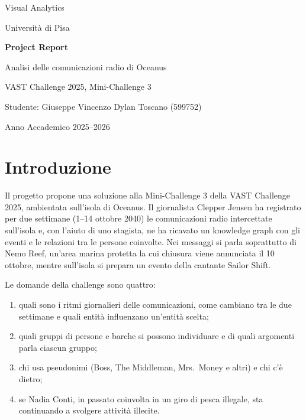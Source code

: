 \documentclass[11pt,a4paper]{article}
\begin{document}
\begin{titlepage}
\centering
\vspace*{3cm}
{\large Visual Analytics\par}
\vspace{0.4cm}
{\normalsize Università di Pisa\par}
\vspace{2.5cm}
{\huge\bfseries Project Report\par}
\vspace{0.8cm}
{\large Analisi delle comunicazioni radio di Oceanus\par}
\vspace{0.2cm}
{\large VAST Challenge 2025, Mini-Challenge 3\par}
\vfill
{\normalsize Studente: Giuseppe Vincenzo Dylan Toscano (599752)\par}
\vspace{0.4cm}
{\normalsize Anno Accademico 2025--2026\par}
\vspace*{2.5cm}
\end{titlepage}

\tableofcontents
\newpage

\section{Introduzione}
Il progetto propone una soluzione alla Mini-Challenge 3 della VAST Challenge 2025, ambientata sull'isola di
Oceanus. Il giornalista Clepper Jensen ha registrato per due settimane (1--14 ottobre 2040) le comunicazioni radio
intercettate sull'isola e, con l'aiuto di uno stagista, ne ha ricavato un knowledge graph con gli eventi e le
relazioni tra le persone coinvolte. Nei messaggi si parla soprattutto di Nemo Reef, un'area marina protetta la
cui chiusura viene annunciata il 10 ottobre, mentre sull'isola si prepara un evento della cantante Sailor Shift.

Le domande della challenge sono quattro:
\begin{enumerate}
  \item quali sono i ritmi giornalieri delle comunicazioni, come cambiano tra le due settimane e quali entità
        influenzano un'entità scelta;
  \item quali gruppi di persone e barche si possono individuare e di quali argomenti parla ciascun gruppo;
  \item chi usa pseudonimi (Boss, The Middleman, Mrs.\ Money e altri) e chi c'è dietro;
  \item se Nadia Conti, in passato coinvolta in un giro di pesca illegale, sta continuando a svolgere attività illecite.
\end{enumerate}
\end{document}
